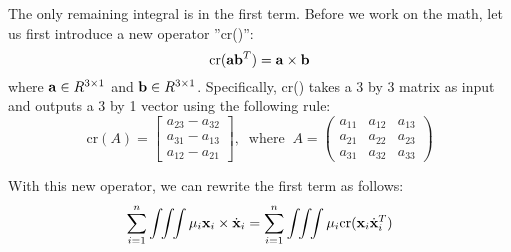 The only remaining integral is in the first term. Before we work on
the math, let us first introduce a new operator ''cr()'':
\begin{equation}
\mathrm{cr}(\mathbf{a}\mathbf{b}^T) = \mathbf{a} \times \mathbf{b}
\end{equation}
where $\mathbf{a} \in R^{3 \times 1}$ and $\mathbf{b} \in R^{3 \times 1}$. Specifically,
cr() takes a 3 by 3 matrix as input and outputs a 3 by 1 vector
using the following rule:
\begin{equation}
\mathrm{cr}(A) = 
\left [
\begin{array}{c}
a_{23} - a_{32} \\
a_{31} - a_{13} \\
a_{12} - a_{21}
\end{array}
\right ],\mathrm{\;\;where\;\;} A = \left (
\begin{array}{ccc}
a_{11} & a_{12} & a_{13} \\
a_{21} & a_{22} & a_{23} \\
a_{31} & a_{32} & a_{33} 
\end{array}
\right )
\end{equation}

With this new operator, we can rewrite the first term as follows:
\begin{equation}
\sum_{i=1}^n \int \!\! \int \!\! \int \mu_i \vc{x}_i \times
\dot{\vc{x}}_i =  \sum_{i=1}^n \int \!\! \int \!\! \int \mu_i
\mathrm{cr}(\vc{x}_i \dot{\vc{x}}_i^T)
\label{eqn:first_term}
\end{equation}

